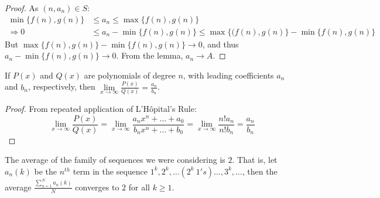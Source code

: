 \documentclass[crop=false,class=book,oneside]{standalone}
\begin{document}
            \begin{proof}
            As $(n,a_n)\in S$:
            \begin{align*}
                \min\{f(n),g(n)\} &\leq a_n \leq \max\{f(n),g(n)\}\\
                \Rightarrow 0 &\leq a_n - \min\{f(n),g(n)\} \leq \max\{(f(n),g(n)\}-\min\{f(n),g(n)\}    
            \end{align*}
            But $\max\{f(n),g(n)\}-\min\{f(n),g(n)\} \rightarrow 0$, and thus $a_n - \min\{f(n),g(n)\} \rightarrow 0$. From the lemma, $a_n \rightarrow A$.
            \end{proof}
            \begin{lemma}
            If $P(x)$ and $Q(x)$ are polynomials of degree $n$, with leading coefficients $a_n$ and $b_n$, respectively, then $\underset{x\rightarrow \infty}\lim \frac{P(x)}{Q(x)} = \frac{a_n}{b_n}$.
            \end{lemma}
            \begin{proof}
            From repeated application of L'H\^{o}pital's Rule:
            \begin{equation*}
                \underset{x\rightarrow \infty}\lim \frac{P(x)}{Q(x)} = \underset{x\rightarrow \infty}\lim \frac{a_n x^n + \hdots + a_0}{b_n x^n + \hdots + b_0} = \underset{x\rightarrow \infty} \lim\frac{n! a_n}{n! b_n} = \frac{a_n}{b_n}
            \end{equation*}
            \end{proof}
            \begin{theorem}
            The average of the family of sequences we were considering is $2$. That is, let $a_n(k)$ be the $n^{th}$ term in the sequence $1^k, 2^k, \hdots (2^k\ 1's)\hdots,3^k,\hdots$, then the average $\frac{\sum_{n=1}^{N} a_n(k)}{N}$ converges to $2$ for all $k\geq 1$.
            \end{theorem}
\end{document}
